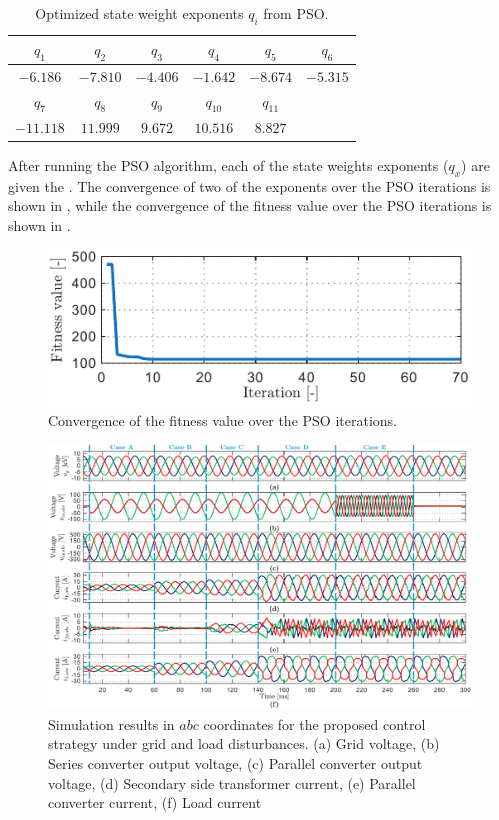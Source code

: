 \begin{table}[h!]
    \centering
    \caption{Optimized state weight exponents $q_i$ from PSO.}
    \label{tab:PSO_Weights}
    \begin{tabular}{|c|c|c|c|c|c|}
        \hline
        $q_1$ & $q_2$ & $q_3$ & $q_4$ & $q_5$ & $q_6$\\
        \hline
        $-6.186$ & $-7.810$ & $-4.406$ & $-1.642$ & $-8.674$ & $-5.315$\\
        \hline
        $q_7$ & $q_8$ & $q_9$ & $q_{10}$ & $q_{11}$ &\\
        \hline
        $-11.118$ & $11.999$ & $9.672$ & $10.516$ & $8.827$ & \\
        \hline
    \end{tabular}
\end{table}

After running the PSO algorithm, each of the state weights exponents ($q_x$) are given the . The convergence of two of the exponents over the PSO iterations is shown in , while the convergence of the fitness value over the PSO iterations is shown in .


\begin{figure}[t!]
    \centering
    \includegraphics[]{Images/Fitness_iterations.pdf}
    \caption{Convergence of the fitness value over the PSO iterations.}
    \label{fig:PSO_Fitness}
\end{figure}

\begin{figure}[t!]
    \centering
    \includegraphics[width=\textwidth]{Images/Simulation_Results.pdf}
    \caption{Simulation results in $abc$ coordinates for the proposed control strategy under grid and load disturbances. (a) Grid voltage, (b) Series converter output voltage, (c) Parallel converter output voltage, (d) Secondary side transformer current, (e) Parallel converter current, (f) Load current}
    \label{fig:Sim_results}
\end{figure}
